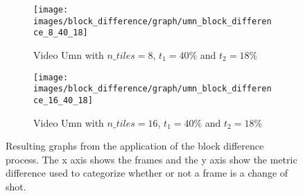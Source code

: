 \documentclass[journal]{IEEEtran}
\begin{document}
\begin{figure}
	\centering
	\begin{subfigure}{0.23\textwidth}
		\centering
		\texttt{[image: images/block\_difference/graph/umn\_block\_difference\_8\_40\_18]} 
		\caption{Video Umn with $n\_tiles = 8$, $t_1 = 40\%$ and $t_2 = 18\%$}
		\label{fig:block_difference:graph:umn_8_40_18} 
	\end{subfigure}
	\centering
	\begin{subfigure}{0.23\textwidth}
		\centering
		\texttt{[image: images/block\_difference/graph/umn\_block\_difference\_16\_40\_18]}
		\caption{Video Umn with $n\_tiles = 16$, $t_1 = 40\%$ and $t_2 = 18\%$}
		\label{fig:block_difference:graph:umn_16_40_18}
	\end{subfigure}
	
	
	\caption{Resulting graphs from the application of the block difference process. The x axis shows the frames and the y axis show the metric difference used to categorize whether or not a frame is a change of shot.}
	\label{fig:block_difference:graph}
\end{figure}
\end{document}
